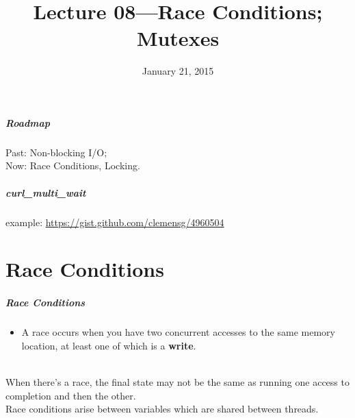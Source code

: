 \documentclass[aspectratio=43]{beamer}
\title{Lecture 08---Race Conditions; Mutexes}
\date{January 21, 2015}
\newenvironment{changemargin}[1]{%
  \begin{list}{}{%
    \setlength{\topsep}{0pt}%
    \setlength{\leftmargin}{#1}%
    \setlength{\rightmargin}{1em}
    \setlength{\listparindent}{\parindent}%
    \setlength{\itemindent}{\parindent}%
    \setlength{\parsep}{\parskip}%
  }%
  \item[]}{\end{list}}
\begin{document}
\begin{frame}[plain]
  \titlepage
\end{frame}

\begin{frame}
  \frametitle{Roadmap}

  \Large
    \begin{changemargin}{2cm}
  Past: Non-blocking I/O;\\[1em]

  Now: Race Conditions, Locking.
    \end{changemargin}
  
\end{frame}

\begin{frame}
  \frametitle{curl\_multi\_wait}

  \begin{changemargin}{2.5cm}
    example: \url{https://gist.github.com/clemensg/4960504}
  \end{changemargin}

\end{frame}

\part{Race Conditions}
\frame{\partpage}

\begin{frame}
  \frametitle{Race Conditions}

  \begin{changemargin}{2.5cm}
  \begin{itemize}
    \item A race occurs when you have two concurrent accesses to the
      same memory location, at least one of which is a {\bf write}.
  \end{itemize}~\\

   When there's a race, the final state may not be the same as
      running one access to completion and then the other.\\[1em]
   Race conditions arise between variables which
      are shared between threads.
  \end{changemargin}

\end{frame}
\end{document}
